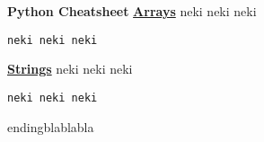 \documentclass[a4paper]{article}
\begin{document}
\setlength{\columnsep}{1cm}
\setlength{\columnseprule}{0.6pt}





\begin{multicols*}{4}
\textbf{Python Cheatsheet} \newline
\textbf{\underline{Arrays}} \newline
\newline
neki neki neki

\tiny{}
\begin{verbatim}
neki neki neki

\end{verbatim}
\normalsize{}
\vfill
\columnbreak
\textbf{\underline{Strings}} \newline
\newline
\newline
neki neki neki

\tiny{}
\begin{verbatim}
neki neki neki

\end{verbatim}
\normalsize{}



\color{white}endingblablabla
\end{multicols*}
\end{document}
